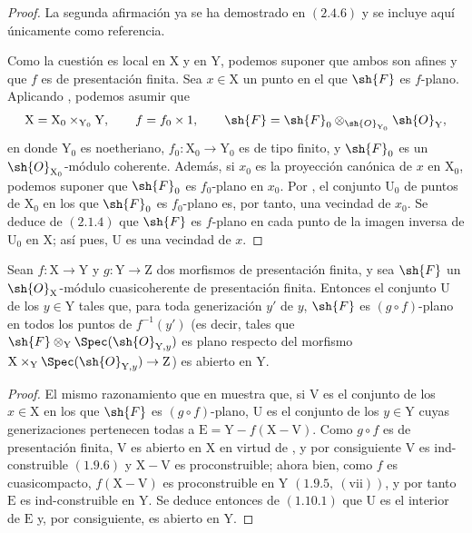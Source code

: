 \begin{proof}
La segunda afirmación ya se ha demostrado en $(2.4.6)$ y se incluye
aquí únicamente como referencia.

Como la cuestión es local en $\mathrm{X}$ y en $\mathrm{Y}$, podemos
suponer que ambos son afines y que $f$ es de presentación finita. Sea
$x\in\mathrm{X}$ un punto en el que $\sh{F}$ es $f$-plano. Aplicando
, podemos asumir que
\[
  \mathrm{X}=\mathrm{X}_0\times_{\mathrm{Y}_0}\mathrm{Y},
  \qquad
  f=f_0\times 1,
  \qquad
  \sh{F}
  =\sh{F}_0\otimes_{\sh{O}_{\mathrm{Y}_0}}\sh{O}_\mathrm{Y},
\]
en donde $\mathrm{Y}_0$ es noetheriano,
$f_0:\mathrm{X}_0\to\mathrm{Y}_0$ es de tipo finito, y
$\sh{F}_0$ es un $\sh{O}_{\mathrm{X}_0}$-módulo coherente. Además, si
$x_0$ es la proyección canónica de $x$ en $\mathrm{X}_0$, podemos
suponer que $\sh{F}_0$ es $f_0$-plano en $x_0$. Por
, el conjunto $\mathrm{U}_0$ de puntos de
$\mathrm{X}_0$ en los que $\sh{F}_0$ es $f_0$-plano es, por tanto, una
vecindad de $x_0$. Se deduce de $(2.1.4)$ que $\sh{F}$ es
$f$-plano en cada punto de la imagen inversa de $\mathrm{U}_0$ en
$\mathrm{X}$; así pues, $\mathrm{U}$ es una vecindad de $x$.
\end{proof}


\begin{corollary}[11.3.2]
\label{IV.11.3.2}
Sean $f:\mathrm{X}\to\mathrm{Y}$ y $g:\mathrm{Y}\to\mathrm{Z}$ dos morfismos de presentación finita, y sea $\sh{F}$ un $\sh{O}_\mathrm{X}$-módulo cuasicoherente de presentación finita. Entonces el conjunto $\mathrm{U}$ de los $y\in\mathrm{Y}$ tales que, para toda generización $y'$ de $y$, $\sh{F}$ es $(g\circ f)$-plano en todos los puntos de $f^{-1}(y')$ (es decir, tales que $\sh{F}\otimes_\mathrm{Y}\Spec(\sh{O}_{\mathrm{Y},y})$ es plano respecto del morfismo $\mathrm{X}\times_\mathrm{Y}\Spec(\sh{O}_{\mathrm{Y},y})\to\mathrm{Z}$) es abierto en $\mathrm{Y}$.
\end{corollary}

\begin{proof}
El mismo razonamiento que en  muestra que, si $\mathrm{V}$ es el conjunto de los $x\in\mathrm{X}$ en los que $\sh{F}$ es $(g\circ f)$-plano, $\mathrm{U}$ es el conjunto de los $y\in\mathrm{Y}$ cuyas generizaciones pertenecen todas a $\mathrm{E}=\mathrm{Y}-f(\mathrm{X}-\mathrm{V})$. Como $g\circ f$ es de presentación finita, $\mathrm{V}$ es abierto en $\mathrm{X}$ en virtud de , y por consiguiente $\mathrm{V}$ es ind-construible $(1.9.6)$ y $\mathrm{X}-\mathrm{V}$ es proconstruible; ahora bien, como $f$ es cuasicompacto, $f(\mathrm{X}-\mathrm{V})$ es proconstruible en $\mathrm{Y}$ $(1.9.5,~(\mathrm{vii}))$, y por tanto $\mathrm{E}$ es ind-construible en $\mathrm{Y}$. Se deduce entonces de $(1.10.1)$ que $\mathrm{U}$ es el interior de $\mathrm{E}$ y, por consiguiente, es abierto en $\mathrm{Y}$.
\end{proof}

